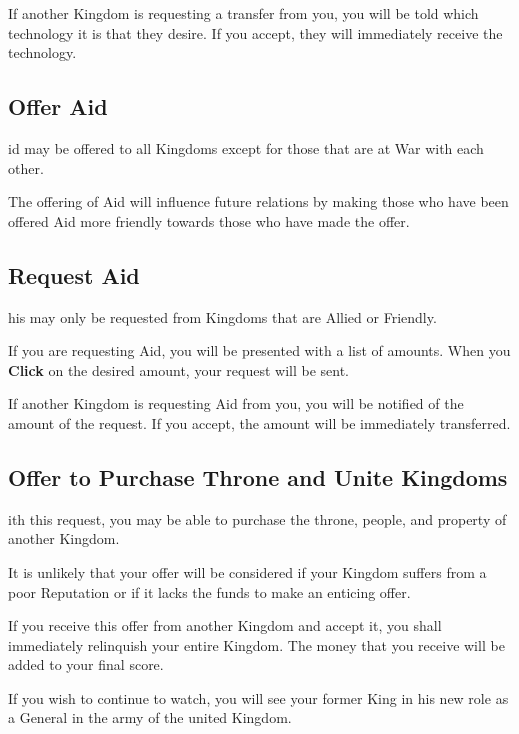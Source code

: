 If another Kingdom is requesting a transfer from you, you will be told which technology it is that they desire. If you accept, they will immediately receive the technology.

\subsection{Offer Aid}

id may be offered to all Kingdoms except for those that are at War with each other.

The offering  of Aid will influence future relations by making those who have been offered Aid more friendly towards those who have made the offer.

\subsection{Request Aid}


his may only be requested from Kingdoms that are Allied or Friendly.

If you are requesting Aid, you will be presented with a list of amounts. When you \textbf{Click} on the desired amount, your request will be sent.

If another Kingdom is requesting Aid from you, you will be notified of the amount of the request. If you accept, the amount will be immediately transferred.

\subsection{Offer to Purchase Throne and Unite Kingdoms}


ith this request, you may be able to purchase the throne, people, and property of another Kingdom.

It is unlikely that your offer will be considered if your Kingdom suffers from a poor Reputation or if it lacks the funds to make an enticing offer.

If you receive this offer from another Kingdom and accept it, you shall immediately relinquish your entire Kingdom. The money that you receive will be added to your final score.

If you wish to continue to watch, you will see your former King in his new role as a General in the army of the united Kingdom.

